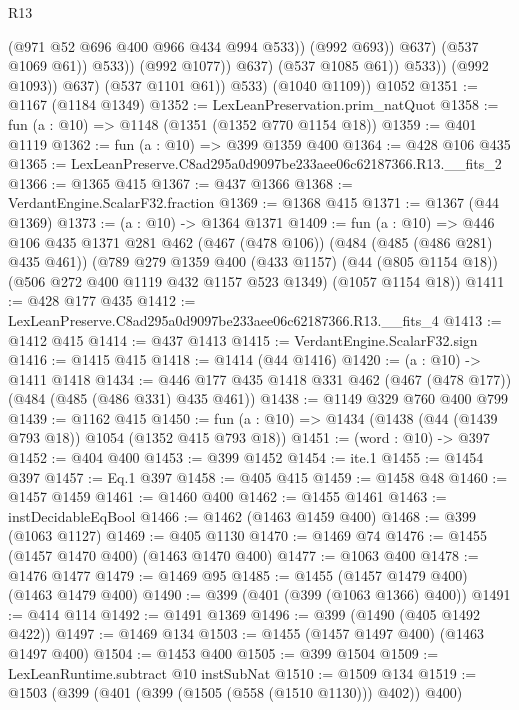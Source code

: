 \begin{lexlean}{R13}
\begin{coremodule}
                                    (@971 @52 @696 @400 @966 @434 @994 @533))
                                  (@992 @693))
                                @637)
                              (@537 @1069 @61))
                            @533))
                        (@992 @1077))
                      @637)
                    (@537 @1085 @61))
                  @533))
              (@992 @1093))
            @637)
          (@537 @1101 @61))
        @533)
      (@1040 @1109))
    @1052
@1351 := @1167 (@1184 @1349)
@1352 := LexLeanPreservation.prim_natQuot
@1358 := fun (a : @10) => @1148 (@1351 (@1352 @770 @1154 @18))
@1359 := @401 @1119
@1362 := fun (a : @10) => @399 @1359 @400
@1364 := @428 @106 @435
@1365 := LexLeanPreserve.C8ad295a0d9097be233aee06c62187366.R13.__fits_2
@1366 := @1365 @415
@1367 := @437 @1366
@1368 := VerdantEngine.ScalarF32.fraction
@1369 := @1368 @415
@1371 := @1367 (@44 @1369)
@1373 := (a : @10) -> @1364 @1371
@1409 := fun (a : @10) =>
  @446
    @106
    @435
    @1371
    @281
    @462
    (@467 (@478 @106))
    (@484 (@485 (@486 @281) @435 @461))
    (@789
      @279
      @1359
      @400
      (@433 @1157)
      (@44 (@805 @1154 @18))
      (@506 @272 @400 @1119 @432 @1157 @523 @1349)
      (@1057 @1154 @18))
@1411 := @428 @177 @435
@1412 := LexLeanPreserve.C8ad295a0d9097be233aee06c62187366.R13.__fits_4
@1413 := @1412 @415
@1414 := @437 @1413
@1415 := VerdantEngine.ScalarF32.sign
@1416 := @1415 @415
@1418 := @1414 (@44 @1416)
@1420 := (a : @10) -> @1411 @1418
@1434 := @446 @177 @435 @1418 @331 @462 (@467 (@478 @177)) (@484 (@485 (@486 @331) @435 @461))
@1438 := @1149 @329 @760 @400 @799
@1439 := @1162 @415
@1450 := fun (a : @10) => @1434 (@1438 (@44 (@1439 @793 @18)) @1054 (@1352 @415 @793 @18))
@1451 := (word : @10) -> @397
@1452 := @404 @400
@1453 := @399 @1452
@1454 := ite.{1}
@1455 := @1454 @397
@1457 := Eq.{1} @397
@1458 := @405 @415
@1459 := @1458 @48
@1460 := @1457 @1459
@1461 := @1460 @400
@1462 := @1455 @1461
@1463 := instDecidableEqBool
@1466 := @1462 (@1463 @1459 @400)
@1468 := @399 (@1063 @1127)
@1469 := @405 @1130
@1470 := @1469 @74
@1476 := @1455 (@1457 @1470 @400) (@1463 @1470 @400)
@1477 := @1063 @400
@1478 := @1476 @1477
@1479 := @1469 @95
@1485 := @1455 (@1457 @1479 @400) (@1463 @1479 @400)
@1490 := @399 (@401 (@399 (@1063 @1366) @400))
@1491 := @414 @114
@1492 := @1491 @1369
@1496 := @399 (@1490 (@405 @1492 @422))
@1497 := @1469 @134
@1503 := @1455 (@1457 @1497 @400) (@1463 @1497 @400)
@1504 := @1453 @400
@1505 := @399 @1504
@1509 := LexLeanRuntime.subtract @10 instSubNat
@1510 := @1509 @134
@1519 := @1503 (@399 (@401 (@399 (@1505 (@558 (@1510 @1130))) @402)) @400)

\end{coremodule}
\end{lexlean}
